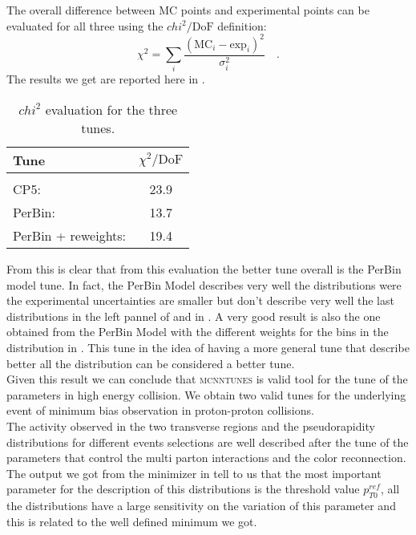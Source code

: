 The overall difference between MC points and experimental points can be evaluated for all three using the $chi^2/\mathrm{DoF}$ definition:
\begin{equation}
	\chi^2=\displaystyle\sum_i\frac{(\text{MC}_i-\text{exp}_i)^2}{\sigma_i^2}\quad.
\end{equation}
The results we get are reported here in . 
\begin{table}[!htb]
	\centering
	\begin{tabular}{l  c }
		Tune & $\chi^2/\mathrm{DoF}$\\[2pt]\hline\hline
		\\[-0.85em]
		CP5: & 23.9\\[2pt]
		PerBin: & 13.7\\[2pt]
		PerBin + reweights: & 19.4\\[2pt]
	\end{tabular}
	\caption{$chi^2$ evaluation for the three tunes.}
	\label{table:chi2_MinBias}
\end{table}
From this is clear that from this evaluation the better tune overall is the PerBin model tune. In fact, the PerBin Model describes very well the distributions were the experimental uncertainties are smaller but don't describe very well the last distributions in the left pannel of  and in . A very good result is also the one obtained from the PerBin Model with the different weights for the bins in the distribution in . This tune in the idea of having a more general tune that describe better all the distribution can be considered a better tune.
\\
Given this result we can conclude that \textsc{mcnntunes} is valid tool for the tune of the parameters in high energy collision. We obtain two valid tunes for the underlying event of minimum bias observation in proton-proton collisions.
\\
The activity observed in the two transverse regions and the pseudorapidity distributions for different events selections are well described after the tune of the parameters that control the multi parton interactions and the color reconnection. 
\\
The output we got from the minimizer in  tell to us that the most important parameter for the description of this distributions is the threshold value $p_{T0}^{ref}$, all the distributions have a large sensitivity on the variation of this parameter and this is related to the well defined minimum we got.
